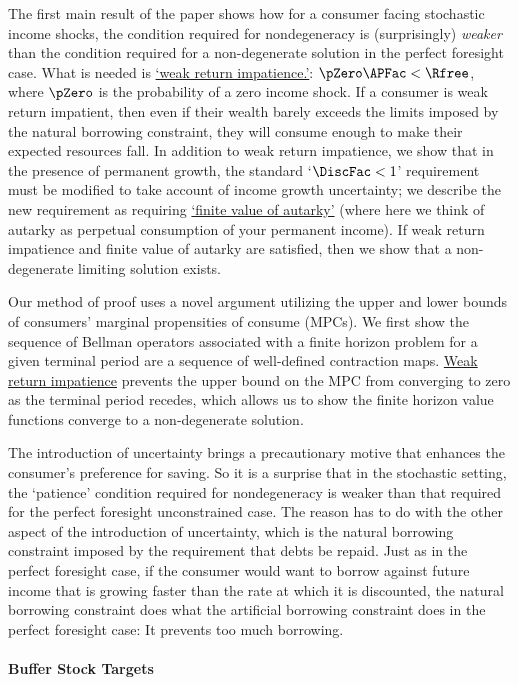 \documentclass[BufferStockTheory]{subfiles}
\begin{document}
The first main result of the paper shows how for a consumer facing stochastic income shocks, the condition required for nondegeneracy is (surprisingly) \textit{weaker} than the condition required for a non-degenerate solution in the perfect foresight case.
What is needed is \hyperlink{WRIC}{`weak return impatience.'}: $\pZero \APFac < \Rfree$, where $\pZero $ is the probability of a zero income shock.
If a consumer is weak return impatient, then even if their wealth barely exceeds the limits imposed by the natural borrowing constraint, they will consume enough to make their expected resources fall.
In addition to weak return impatience, we show that in the presence of permanent growth, the standard `$\DiscFac<1$' requirement must be modified to take account of income growth uncertainty; we describe the new requirement as requiring \hyperlink{FVAC}{`finite value of autarky'} (where here we think of autarky as perpetual consumption of your permanent income).
If weak return impatience and finite value of autarky are satisfied, then we show that a non-degenerate limiting solution exists.

Our method of proof uses a novel argument utilizing the upper and lower bounds of consumers' marginal propensities of consume (MPCs).
We first show the sequence of Bellman operators associated with a finite horizon problem for a given terminal period are a sequence of well-defined contraction maps.
\hyperlink{WRIC}{Weak return impatience} prevents the upper bound on the MPC from converging to zero as the terminal period recedes, which allows us to show the finite horizon value functions converge to a non-degenerate solution.


The introduction of uncertainty brings a precautionary motive that enhances the consumer's preference for saving.
So it is a surprise that in the stochastic setting, the `patience' condition required for nondegeneracy is weaker than that required for the perfect foresight unconstrained case.
The reason has to do with the other aspect of the introduction of uncertainty, which is the natural borrowing constraint imposed by the requirement that debts be repaid.
Just as in the perfect foresight case, if the consumer would want to borrow against future income that is growing faster than the rate at which it is discounted, the natural borrowing constraint does what the artificial borrowing constraint does in the perfect foresight case: It prevents too much borrowing.

\paragraph{Buffer Stock Targets}
\end{document}
